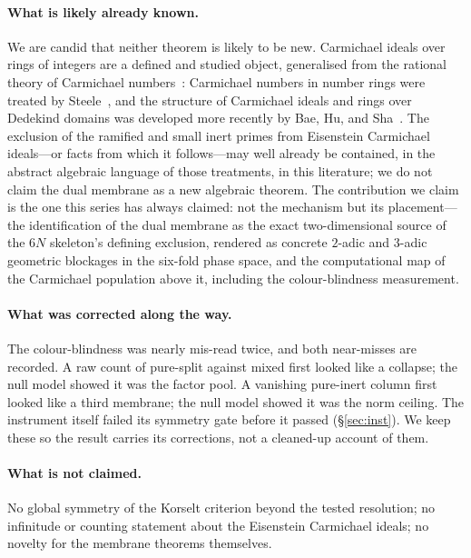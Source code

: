 \documentclass[11pt]{article}
\begin{document}
\paragraph{What is likely already known.} We are candid that neither theorem is likely to be new.
Carmichael ideals over rings of integers are a defined and studied object, generalised from the
rational theory of Carmichael numbers~\cite{AGP}: Carmichael numbers in number rings were treated by
Steele~\cite{Steele2008}, and the structure of Carmichael ideals and rings over Dedekind domains was
developed more recently by Bae, Hu, and Sha~\cite{Bae2023}. The exclusion of the ramified and small
inert primes from Eisenstein Carmichael ideals---or facts from which it follows---may well already be
contained, in the abstract algebraic language of those treatments, in this literature; we do not claim
the dual membrane as a new algebraic theorem. The contribution we claim is the one this series has
always claimed: not the mechanism but its placement---the identification of the dual membrane as the
exact two-dimensional source of the $6N$ skeleton's defining exclusion, rendered as concrete $2$-adic
and $3$-adic geometric blockages in the six-fold phase space, and the computational map of the
Carmichael population above it, including the colour-blindness measurement.

\paragraph{What was corrected along the way.} The colour-blindness was nearly mis-read twice, and both
near-misses are recorded. A raw count of pure-split against mixed first looked like a collapse; the null
model showed it was the factor pool. A vanishing pure-inert column first looked like a third membrane;
the null model showed it was the norm ceiling. The instrument itself failed its symmetry gate before it
passed (\S\ref{sec:inst}). We keep these so the result carries its corrections, not a cleaned-up account
of them.

\paragraph{What is not claimed.} No global symmetry of the Korselt criterion beyond the tested
resolution; no infinitude or counting statement about the Eisenstein Carmichael ideals; no novelty for
the membrane theorems themselves.
\end{document}
